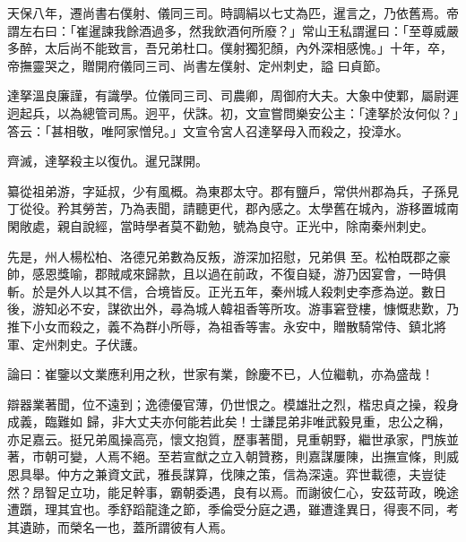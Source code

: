 \begin{pinyinscope}
 天保八年，遷尚書右僕射、儀同三司。時調絹以七丈為匹，暹言之，乃依舊焉。帝謂左右曰：「崔暹諫我餘酒過多，然我飲酒何所廢？」常山王私謂暹曰：「至尊威嚴多醉，太后尚不能致言，吾兄弟杜口。僕射獨犯顏，內外深相感愧。」十年，卒，帝撫靈哭之，贈開府儀同三司、尚書左僕射、定州刺史，謚
 曰貞節。



 達拏溫良廉謹，有識學。位儀同三司、司農卿，周御府大夫。大象中使鄴，屬尉遲迥起兵，以為總管司馬。迥平，伏誅。初，文宣嘗問樂安公主：「達拏於汝何似？」答云：「甚相敬，唯阿家憎兒。」文宣令宮人召達拏母入而殺之，投漳水。



 齊滅，達拏殺主以復仇。暹兄謀開。



 纂從祖弟游，字延叔，少有風概。為東郡太守。郡有鹽戶，常供州郡為兵，子孫見丁從役。矜其勞苦，乃為表聞，請聽更代，郡內感之。太學舊在城內，游移置城南閑敞處，親自說經，當時學者莫不勸勉，號為良守。正光中，除南秦州刺史。



 先是，州人楊松柏、洛德兄弟數為反叛，游深加招慰，兄弟俱
 至。松柏既郡之豪帥，感恩獎喻，郡賊咸來歸款，且以過在前政，不復自疑，游乃因宴會，一時俱斬。於是外人以其不信，合境皆反。正光五年，秦州城人殺刺史李彥為逆。數日後，游知必不安，謀欲出外，尋為城人韓祖香等所攻。游事窘登樓，慷慨悲歎，乃推下小女而殺之，義不為群小所辱，為祖香等害。永安中，贈散騎常侍、鎮北將軍、定州刺史。子伏護。



 論曰：崔鑒以文業應利用之秋，世家有業，餘慶不已，人位繼軌，亦為盛哉！



 辯器業著聞，位不遠到；逸德優官薄，仍世恨之。模雄壯之烈，楷忠貞之操，殺身成義，臨難如
 歸，非大丈夫亦何能若此矣！士謙昆弟非唯武毅見重，忠公之稱，亦足嘉云。挺兄弟風操高亮，懷文抱質，歷事著聞，見重朝野，繼世承家，門族並著，市朝可變，人焉不絕。至若宣猷之立入朝贊務，則嘉謀屢陳，出撫宣條，則威恩具舉。仲方之兼資文武，雅長謀算，伐陳之策，信為深遠。弈世載德，夫豈徒然？昂智足立功，能足幹事，霸朝委遇，良有以焉。而謝彼仁心，安茲苛政，晚途遭躓，理其宜也。季舒蹈龍逢之節，季倫受分庭之遇，雖遭逢異日，得喪不同，考其遺跡，而榮名一也，蓋所謂彼有人焉。



\end{pinyinscope}